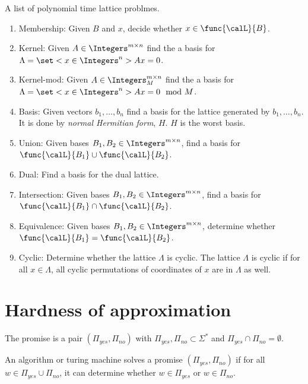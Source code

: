 A list of polynomial time lattice problmes.
\begin{enumerate}
    \item Membership: Given \(B\) and \(x\), decide whether \(x \in \func{\calL}{B}\).
    \item Kernel: Given \(A \in \Integers^{m \times n}\) find the a basis for \(\Lambda = \set<x \in \Integers^n>{Ax = 0}\).
    \item  Kernel-mod: Given \(A \in \Integers_M^{m \times n}\) find the a basis for \(\Lambda = \set<x \in \Integers^n>{Ax = 0 \mod M}\).
    \item Basis: Given vectors \(b_1, \dots , b_n\) find a basis for the lattice generated by \(b_1, \dots ,b_n\). It is done by \textit{normal Hermitian form}, \(H\). \(H\) is the worst basis.
    \item Union: Given bases \(B_1 , B_2 \in \Integers^{m \times n}\), find a basis for \(\func{\calL}{B_1} \cup \func{\calL}{B_2}\).
    \item Dual: Find a basis for the dual lattice.
    \item Intersection: Given bases \(B_1 , B_2 \in \Integers^{m \times n}\), find a basis for \(\func{\calL}{B_1} \cap \func{\calL}{B_2}\).
    \item Equivalence: Given bases \(B_1 , B_2 \in \Integers^{m \times n}\), determine whether  \(\func{\calL}{B_1} = \func{\calL}{B_2}\).
    \item Cyclic: Determine whether the lattice \(\Lambda\) is cyclic. The lattice \(\Lambda\) is cyclic if for all \(x \in \Lambda\), all cyclic permutations of coordinates of \(x\) are in \(\Lambda\) as well.
\end{enumerate}
\section{Hardness of approximation}
\begin{definition}
    The promise is a pair \((\Pi_{yes}, \Pi_{no})\) with \(\Pi_{yes},\Pi_{no} \subset \Sigma^{\ast}\) and \(\Pi_{yes} \cap \Pi_{no} = \emptyset\).
\end{definition}

\begin{definition}
    An algorithm or turing machine solves a promise \((\Pi_{yes}, \Pi_{no})\) if for all \(w \in \Pi_{yes} \cup \Pi_{no}\), it can determine whether \(w \in \Pi_{yes}\) or \(w \in \Pi_{no}\).
\end{definition}

